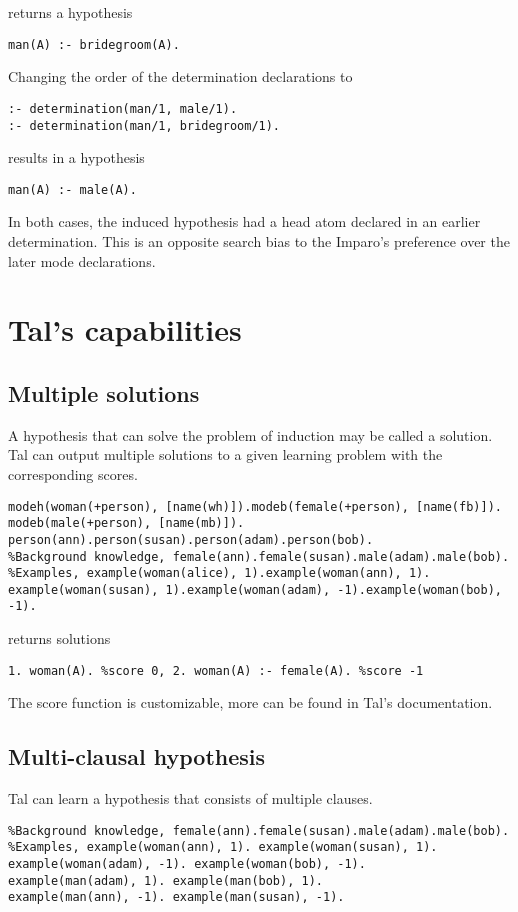 returns a hypothesis
\begin{lstlisting}
man(A) :- bridegroom(A).
\end{lstlisting}

Changing the order of the determination declarations to
\begin{lstlisting}
:- determination(man/1, male/1).
:- determination(man/1, bridegroom/1).
\end{lstlisting}
results in a hypothesis
\begin{lstlisting}
man(A) :- male(A).
\end{lstlisting}
In both cases, the induced hypothesis had a head atom declared in an earlier determination. This is an opposite search bias to the Imparo's preference over the later mode declarations.

\section{Tal's capabilities}

\subsection{Multiple solutions}
A hypothesis that can solve the problem of induction may be called a solution. Tal can output multiple solutions to a given learning problem with the corresponding scores.

\begin{lstlisting}
modeh(woman(+person), [name(wh)]).modeb(female(+person), [name(fb)]).
modeb(male(+person), [name(mb)]).
person(ann).person(susan).person(adam).person(bob).
%Background knowledge, female(ann).female(susan).male(adam).male(bob).
%Examples, example(woman(alice), 1).example(woman(ann), 1).
example(woman(susan), 1).example(woman(adam), -1).example(woman(bob), -1).
\end{lstlisting}
returns solutions
\begin{lstlisting}
1. woman(A). %score 0, 2. woman(A) :- female(A). %score -1
\end{lstlisting}

The score function is customizable, more can be found in Tal's documentation.

\subsection{Multi-clausal hypothesis}
Tal can learn a hypothesis that consists of multiple clauses.

\begin{lstlisting}
%Background knowledge, female(ann).female(susan).male(adam).male(bob). 
%Examples, example(woman(ann), 1). example(woman(susan), 1).
example(woman(adam), -1). example(woman(bob), -1).
example(man(adam), 1). example(man(bob), 1).
example(man(ann), -1). example(man(susan), -1).
\end{lstlisting}

